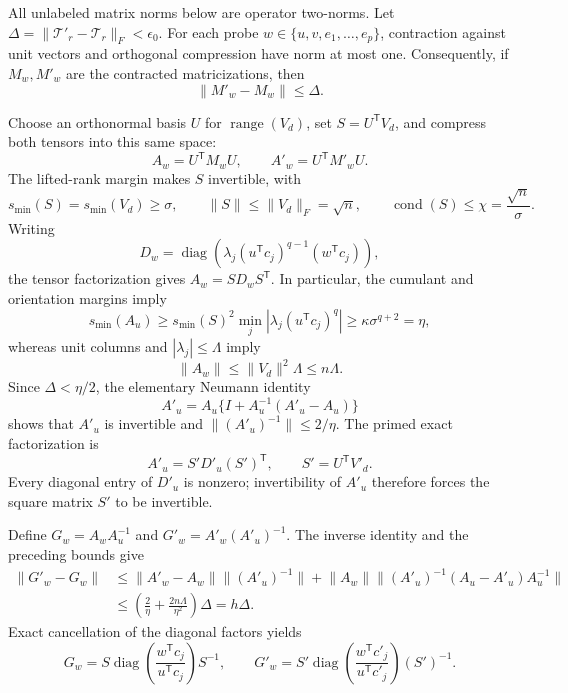 All unlabeled matrix norms below are operator two-norms. Let \(\Delta=\lVert\mathcal T'_r-\mathcal T_r\rVert_F<\epsilon_0\). For each probe \(w\in\{u,v,e_1,\ldots,e_p\}\), contraction against unit vectors and orthogonal compression have norm at most one. Consequently, if \(M_w,M'_w\) are the contracted matricizations, then
\[
 \lVert M'_w-M_w\rVert\le\Delta.
\]

Choose an orthonormal basis \(U\) for \(\operatorname{range}(V_d)\), set \(S=U^{\mathsf T}V_d\), and compress both tensors into this same space:
\[
 A_w=U^{\mathsf T}M_wU,
 \qquad A'_w=U^{\mathsf T}M'_wU.
\]
The lifted-rank margin makes \(S\) invertible, with
\[
 s_{\min}(S)=s_{\min}(V_d)\ge\sigma,
 \qquad \lVert S\rVert\le\lVert V_d\rVert_F=\sqrt n,
 \qquad \operatorname{cond}(S)\le\chi=\frac{\sqrt n}{\sigma}.
\]
Writing
\[
 D_w=\operatorname{diag}\!\left(\lambda_j(u^{\mathsf T}c_j)^{q-1}(w^{\mathsf T}c_j)\right),
\]
the tensor factorization gives \(A_w=SD_wS^{\mathsf T}\). In particular, the cumulant and orientation margins imply
\[
 s_{\min}(A_u)
 \ge s_{\min}(S)^2\min_j|\lambda_j(u^{\mathsf T}c_j)^q|
 \ge\kappa\sigma^{q+2}=\eta,
\]
whereas unit columns and \(|\lambda_j|\le\Lambda\) imply
\[
 \lVert A_w\rVert\le \lVert V_d\rVert^2\Lambda\le n\Lambda.
\]
Since \(\Delta<\eta/2\), the elementary Neumann identity
\[
 A'_u=A_u\{I+A_u^{-1}(A'_u-A_u)\}
\]
shows that \(A'_u\) is invertible and \(\lVert(A'_u)^{-1}\rVert\le2/\eta\). The primed exact factorization is
\[
 A'_u=S'D'_u(S')^{\mathsf T},
 \qquad S'=U^{\mathsf T}V'_d.
\]
Every diagonal entry of \(D'_u\) is nonzero; invertibility of \(A'_u\) therefore forces the square matrix \(S'\) to be invertible.

Define \(G_w=A_wA_u^{-1}\) and \(G'_w=A'_w(A'_u)^{-1}\). The inverse identity and the preceding bounds give
\[
 \begin{aligned}
 \lVert G'_w-G_w\rVert
 &\le \lVert A'_w-A_w\rVert\lVert(A'_u)^{-1}\rVert
   +\lVert A_w\rVert\lVert(A'_u)^{-1}(A_u-A'_u)A_u^{-1}\rVert\\
 &\le\left(\frac2\eta+\frac{2n\Lambda}{\eta^2}\right)\Delta
 =h\Delta.
 \end{aligned}
\]
Exact cancellation of the diagonal factors yields
\[
 G_w=S\operatorname{diag}\!\left(\frac{w^{\mathsf T}c_j}{u^{\mathsf T}c_j}\right)S^{-1},
 \qquad
 G'_w=S'\operatorname{diag}\!\left(\frac{w^{\mathsf T}c'_j}{u^{\mathsf T}c'_j}\right)(S')^{-1}.
\]

